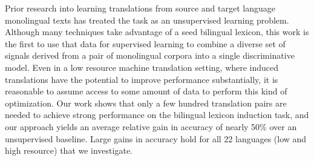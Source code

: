 Prior research into learning translations from source and target language monolingual texts has treated the task as an unsupervised learning problem.
 Although many techniques take advantage of a seed bilingual lexicon, this work
 is the first to use that data for supervised learning to combine a diverse set
 of signals derived from a pair of monolingual corpora into a single
 discriminative model. Even in a low resource machine translation setting, where
 induced translations have the potential to improve performance substantially,
 it is reasonable to assume access to some amount of data to perform this kind
 of optimization. Our work shows that only a few hundred translation pairs are
 needed to achieve strong performance on the bilingual lexicon induction task,
 and our approach yields an average relative gain in accuracy of nearly 50\% over
 an unsupervised baseline. Large gains in accuracy hold for all 22 languages
 (low and high resource) that we investigate.

